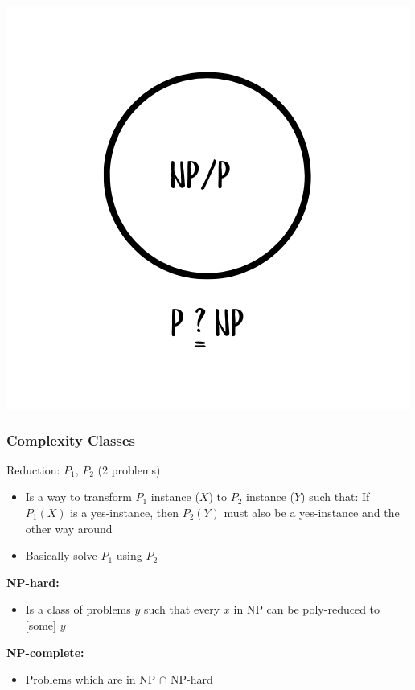 \documentclass[10pt,aspectratio=43]{beamer}
\begin{document}
\begin{frame}
\begin{minipage}{0.48\textwidth}
    \includegraphics[width=\linewidth]{figures/lec/np2.png} 
  \end{minipage}
\end{frame}

\begin{frame}
  \frametitle{Complexity Classes}


  \begin{block}{Reduction: $P_1$, $P_2$ (2 problems)}
    \begin{itemize}
        \item Is a way to transform $P_1$ instance ($X$) to $P_2$ instance ($Y$) such that:
             If $P_1(X)$ is a yes-instance, then $P_2(Y)$ must also be a yes-instance and the other way around
        \item Basically solve $P_1$ using $P_2$
    \end{itemize}
  \end{block}
  
        \vspace{0.3cm}
  \textbf{NP-hard:}
  \begin{itemize}
      \item Is a class of problems $y$ such that every $x$ in NP can be poly-reduced to [some] $y$
  \end{itemize}
      \vspace{0.3cm}
  \textbf{NP-complete:}
  \begin{itemize}
      \item Problems which are in NP $\cap$ NP-hard
  \end{itemize}
\end{frame}
\end{document}
